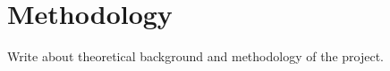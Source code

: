 \chapter{Methodology}\label{cha:methodology}
Write about theoretical background and methodology of the project.